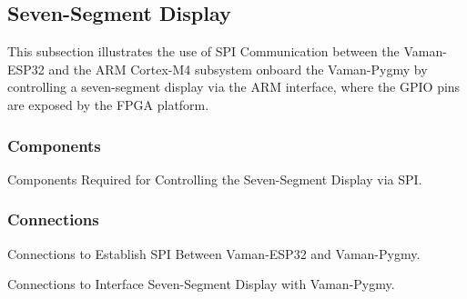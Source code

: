 \subsection{Seven-Segment Display}
This subsection illustrates the use of SPI Communication between the Vaman-ESP32
and the ARM Cortex-M4 subsystem onboard the Vaman-Pygmy by controlling a
seven-segment display via the ARM interface, where the GPIO pins are exposed by
the FPGA platform.

\subsubsection{Components}
\begin{table}[!ht]
    \centering
    
    \caption{Components Required for Controlling the Seven-Segment Display via SPI.}
    \label{tab:esp32-m4-fpga-sevenseg-components}
\end{table}

\subsubsection{Connections}
\begin{table}[!ht]
    \centering
    
    \caption{Connections to Establish SPI Between Vaman-ESP32 and Vaman-Pygmy.}
    \label{tab:esp32-m4-fpga-sevenseg-vaman-connections}
\end{table}

\begin{table}[!ht]
    \centering
    
    \caption{Connections to Interface Seven-Segment Display with Vaman-Pygmy.}
    \label{tab:esp32-m4-fpga-sevenseg-display-connections}
\end{table}

